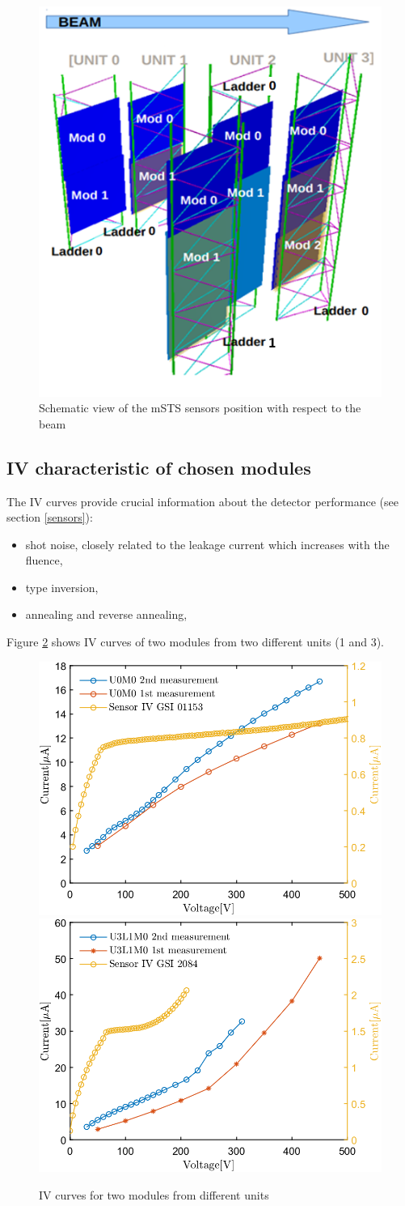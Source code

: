 \begin{figure}[!h]
\centering
\includegraphics[width=0.4\columnwidth]{Chapter5/DCS/images/msts_sensors_scheme.png}
\caption{Schematic view of the \gls{mSTS} sensors position with respect to the beam}
\label{fig_sensors_scheme}
\end{figure}
\newpage
\subsection{IV characteristic of chosen modules}
The IV curves provide crucial information about the detector performance (see section \ref{sensors}):
\begin{itemize}
    \item shot noise, closely related to the leakage current which increases with the fluence,
    \item type inversion,
    \item annealing and reverse annealing,
\end{itemize}
Figure \ref{fig_IV} shows IV curves of two modules from two different units (1 and 3). 
\begin{figure}[!h]
\centering
\includegraphics[width=0.45\columnwidth]{Chapter5/DCS/images/IV/U0FEB1.png}
\includegraphics[width=0.45\columnwidth]{Chapter5/DCS/images/IV/U3L1FEB1.png}
\caption{IV curves for two modules from different units}
\label{fig_IV}
\end{figure}

